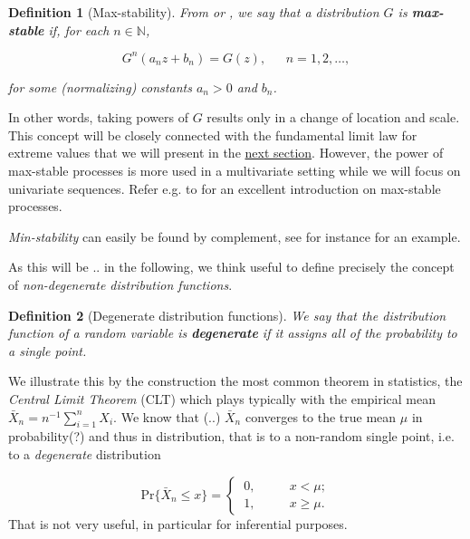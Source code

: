 \documentclass[11pt,a4paper,openany ]{book}
\newtheorem{definition}{Definition}[chapter]
\begin{document}
\begin{definition}[Max-stability] \label{maxstab}
	\emph{From \cite{leadbetter_extremes_1983} or \cite{resnick_extreme_1987}}, we say that a distribution $G$ is \emph{\textbf{max-stable}} if, for each $n\in\mathbb{N}$,
	
	
	\begin{equation}
	G^n(a_nz+b_n)=G(z), \ \ \ \ \ \ \ n= 1,2,\dots ,
	\end{equation}
	
	for some (normalizing) constants $a_n>0$ and $b_n$.
\end{definition}
In other words, taking powers of $G$ results only in a change of location and scale. This concept will be closely connected with the fundamental limit law for extreme values that we will present in the \hyperref[sec:extrtypethm]{next section}.
However, the power of max-stable processes is more used in a multivariate setting while we will focus on univariate sequences. Refer e.g. to \citet{ribatet_spatial_2015} for an excellent introduction on max-stable processes.

\emph{Min-stability} can easily be found by complement, see for instance \citet[pp.23]{ reiss_statistical_2007} for an example.


As this will be .. in the following, we think useful to define precisely the concept of \emph{non-degenerate distribution functions}.
\begin{definition}[Degenerate distribution functions]
	We say that the distribution function of a random variable is \emph{\textbf{degenerate}} if it assigns all of the probability to a single point.
\end{definition}

We illustrate this by the construction the most common theorem in statistics, the \emph{Central Limit Theorem} (CLT) which plays typically with the empirical mean $\bar{X}_n=n^{-1}\sum_{i=1}^nX_i$. We know that (..) $\bar{X}_n$ converges to the true mean $\mu$ in probability(?) and thus in distribution, that is to a non-random single point, i.e. to a \emph{degenerate} distribution 

\begin{equation*}
\text{Pr}\big\{\bar{X}_n\leq x\big\}= \begin{cases}
\ 0, \ \ \ \ \ \ \ \ \ \ \ \ x<\mu; \\
\ 1, \ \ \ \  \ \ \ \ \ \ \ \ x\geq \mu. 
\end{cases}
\end{equation*}
That is not very useful, in particular for inferential purposes.
\end{document}
